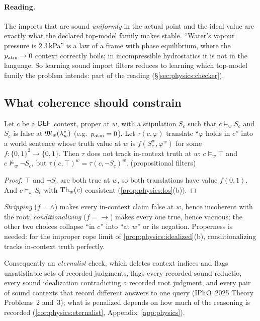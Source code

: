 \paragraph{Reading.} The imports that are sound \emph{uniformly} in the actual point and
the ideal value are exactly what the declared top-model family makes stable. ``Water's
vapour pressure is $2.3$\,kPa'' is a law of a frame with phase equilibrium, where the
$p_{\rm atm}\to0$ context correctly boils; in incompressible hydrostatics it is not in the
language. So learning sound import filters reduces to learning which top-model family the
problem intends: part of the reading (\S\ref{sec:physics:checker}).

\subsection{What coherence should constrain}\label{sec:physics:coherence}

\begin{theorem}\label{thm:physics:eternalism}
Let $c$ be a $\mathsf{DEF}$ context, proper at $w$, with a stipulation $S_c$ such that
$c\models_w S_c$ and $S_c$ is false at $\mathfrak{M}_w(\lambda^*_w)$ (e.g.\ $p_{\rm atm}=0$). Let
$\tau(c,\varphi)$ translate ``$\varphi$ holds in $c$'' into a world sentence whose truth
value at $w$ is $f(S_c^w,\varphi^w)$ for some $f:\{0,1\}^2\to\{0,1\}$. Then $\tau$ does not
track in-context truth at $w$: $c\models_w\top$ and $c\not\models_w\neg S_c$, but
$\tau(c,\top)^w=\tau(c,\neg S_c)^w$.
\hfill{} (propositional filters)
\end{theorem}
\begin{proof}
$\top$ and $\neg S_c$ are both true at $w$, so both translations have value $f(0,1)$. And
$c\models_w S_c$ with $\mathrm{Th}_w(c)$ consistent (\cref{prop:physics:los}(b)).
\end{proof}

\emph{Stripping} ($f=\wedge$) makes every in-context claim false at $w$, hence incoherent
with the root; \emph{conditionalizing} ($f=\to$) makes every one true, hence vacuous; the
other two choices collapse ``in $c$'' into ``at $w$'' or its negation. Properness is
needed: for the improper rope limit of \cref{prop:physics:idealized}(b), conditionalizing
tracks in-context truth perfectly.

Consequently an \emph{eternalist} check, which deletes context indices and flags
unsatisfiable sets of recorded judgments, flags every recorded sound reductio, every sound
idealization contradicting a recorded root judgment, and every pair of sound contexts that
record different answers to one query (IPhO~2025 Theory Problems~2 and~3); what is
penalized depends on how much of the reasoning is recorded (\cref{cor:physics:eternalist},
Appendix~\ref{app:physics}).

